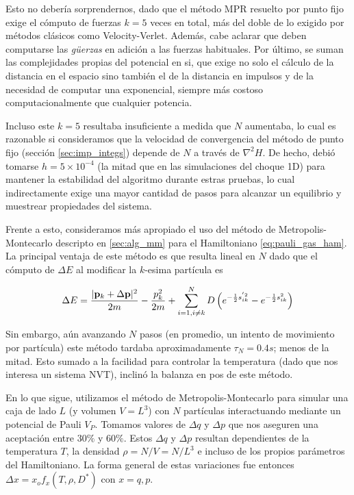Esto no debería sorprendernos, dado que el método MPR resuelto por punto fijo exige el cómputo de fuerzas $k=5$ veces en total, más del doble de lo exigido por métodos clásicos como Velocity-Verlet.
Además, cabe aclarar que deben computarse las \textit{güerzas} en adición a las fuerzas habituales.
Por último, se suman las complejidades propias del potencial en si, que exige no solo el cálculo de la distancia en el espacio sino también el de la distancia en impulsos y de la necesidad 
de computar una exponencial, siempre más costoso computacionalmente que cualquier potencia. 

Incluso este $k=5$ resultaba insuficiente a medida que $N$ aumentaba, lo cual es razonable si consideramos que la velocidad de convergencia del método de punto fijo (sección \ref{sec:imp_integs})
depende de $N$ a través de $\nabla^2H$.
De hecho, debió tomarse $h=5\times10^{-4}$ (la mitad que en las simulaciones del choque 1D) para mantener la estabilidad del algoritmo durante estras pruebas, lo cual indirectamente exige una 
mayor cantidad de pasos para alcanzar un equilibrio y muestrear propiedades del sistema. 

Frente a esto, consideramos más apropiado el uso del método de Metropolis-Montecarlo descripto en \ref{sec:alg_mm} para el Hamiltoniano \eqref{eq:pauli_gas_ham}.
La principal ventaja de este método es que resulta lineal en $N$ dado que el cómputo de $\Delta E$ al modificar la $k$-esima partícula es

\begin{equation}{\label{eq:delta_E}}
 \Delta E =  \frac{|\mathbf{p}_k + \Delta \mathbf{p}|^2}{2m} - \frac{p_k^2}{2m} + \sum_{i=1, i\neq k}^N D\left( e^{-\frac{1}{2}s_{ik}^{'2}}-e^{-\frac{1}{2}s_{ik}^2}  \right)
\end{equation}

Sin embargo, aún avanzando $N$ pasos (en promedio, un intento de movimiento por partícula) este método tardaba aproximadamente $\tau_N = 0.4s$; menos de la mitad.
Esto sumado a la facilidad para controlar la temperatura (dado que nos interesa un sistema NVT), inclinó la balanza en pos de este método.

En lo que sigue, utilizamos el método de Metropolis-Montecarlo para simular una caja de lado $L$ (y volumen $V=L^3$) con $N$ partículas interactuando mediante un potencial de Pauli $V_P$.
Tomamos valores de $\Delta q$ y $\Delta p$ que nos aseguren una aceptación entre $30\%$ y $60\%$.
Estos $\Delta q$ y $\Delta p$ resultan dependientes de la temperatura $T$, la densidad $\rho = N/V = N/L^3$ e incluso de los propios parámetros del Hamiltoniano.
La forma general de estas variaciones fue entonces $\Delta x = x_o f_x(T, \rho, D^*)$  con $x=q,p$.


